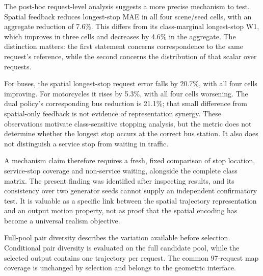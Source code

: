 The post-hoc request-level analysis suggests a more precise mechanism to test. Spatial feedback reduces longest-stop MAE in all four scene/seed cells, with an aggregate reduction of 7.6\%. This differs from its class-marginal longest-stop W1, which improves in three cells and decreases by 4.6\% in the aggregate. The distinction matters: the first statement concerns correspondence to the same request's reference, while the second concerns the distribution of that scalar over requests.


For buses, the spatial longest-stop request error falls by 20.7\%, with all four cells improving. For motorcycles it rises by 5.3\%, with all four cells worsening. The dual policy's corresponding bus reduction is 21.1\%; that small difference from spatial-only feedback is not evidence of representation synergy. These observations motivate class-sensitive stopping analysis, but the metric does not determine whether the longest stop occurs at the correct bus station. It also does not distinguish a service stop from waiting in traffic.

A mechanism claim therefore requires a fresh, fixed comparison of stop location, service-stop coverage and non-service waiting, alongside the complete class matrix. The present finding was identified after inspecting results, and its consistency over two generator seeds cannot supply an independent confirmatory test. It is valuable as a specific link between the spatial trajectory representation and an output motion property, not as proof that the spatial encoding has become a universal realism objective.

Full-pool pair diversity describes the variation available before selection. Conditional pair diversity is evaluated on the full candidate pool, while the selected output contains one trajectory per request. The common 97-request map coverage is unchanged by selection and belongs to the geometric interface.

